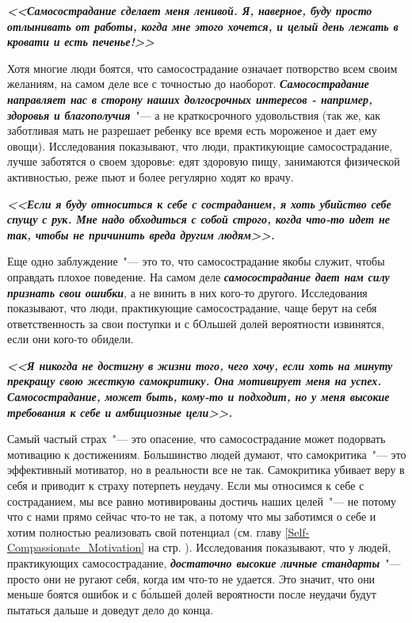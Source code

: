 \vspace{4ex}

\textbf{\textit{<<Самосострадание сделает меня ленивой. Я, наверное, буду просто отлынивать от работы, когда мне этого хочется, и целый день лежать в кровати и есть печенье!>>}}

\vspace{2ex}

Хотя многие люди боятся, что самосострадание означает потворство всем своим желаниям, на самом деле все с точностью до наоборот. \textbf{\textit{Самосострадание направляет нас в сторону наших долгосрочных интересов - например, здоровья и благополучия}}~"--- а не краткосрочного удовольствия (так же, как заботливая мать не разрешает ребенку все время есть мороженое и дает ему овощи).  Исследования показывают, что люди, практикующие самосострадание, лучше заботятся о своем здоровье: едят здоровую пищу, занимаются физической активностью, реже пьют и более регулярно ходят ко врачу. 

\vspace{4ex}

\textbf{\textit{<<Если я буду относиться к себе с состраданием, я хоть убийство себе спущу с рук. Мне надо обходиться с собой строго, когда что-то идет не так, чтобы не причинить вреда другим людям>>.}}

\vspace{2ex}

Еще одно заблуждение~"--- это то, что самосострадание якобы служит, чтобы оправдать плохое поведение. На самом деле \textbf{\textit{самосострадание дает нам силу признать свои ошибки}}, а не винить в них кого-то другого. Исследования показывают, что люди, практикующие самосострадание, чаще берут на себя ответственность за свои поступки и с бОльшей долей вероятности извинятся, если они кого-то обидели. 

\vspace{4ex}
\textbf{\textit{
<<Я никогда не достигну в жизни того, чего хочу, если хоть на минуту прекращу свою жесткую самокритику. Она мотивирует меня на успех. Самосострадание, может быть, кому-то и подходит, но у меня высокие требования к себе и амбициозные цели>>.}}

\vspace{2ex}
 
Самый частый страх~"--- это опасение, что самосострадание может подорвать мотивацию к достижениям. Большинство людей думают, что самокритика~"--- это эффективный мотиватор, но в реальности все не так. Самокритика убивает веру в себя и приводит к страху потерпеть неудачу. Если мы относимся к себе с состраданием, мы все равно мотивированы достичь наших целей~"--- не потому что с нами прямо сейчас что-то не так, а потому что мы заботимся о себе и хотим полностью реализовать свой потенциал (см. главу \ref{Self-Compassionate_Motivation} на стр. \pageref{Self-Compassionate_Motivation}). Исследования показывают, что у людей, практикующих самосострадание, \textbf{\textit{достаточно высокие личные стандарты}}~"--- просто они не ругают себя, когда им что-то не удается. Это значит, что они меньше боятся ошибок и с б\'{о}льшей долей вероятности после неудачи будут пытаться дальше и доведут дело до конца. 

